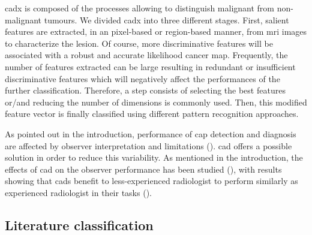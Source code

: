 \Ac{cadx} is composed of the processes allowing to distinguish malignant from non-malignant tumours. We divided \ac{cadx} into three different stages. First, salient features are extracted, in an pixel-based or region-based manner, from \ac{mri} images to characterize the lesion. Of course, more discriminative features will be associated with a robust and accurate likelihood cancer map. Frequently, the number of features extracted can be large resulting in redundant or insufficient discriminative features which will negatively affect the performances of the further classification. Therefore, a step consists of selecting the best features or/and reducing the number of dimensions is commonly used. Then, this modified feature vector is finally classified using different pattern recognition approaches.

As pointed out in the introduction, performance of \ac{cap} detection and diagnosis are affected by observer interpretation and limitations (\cite{Giger2008,Hambrock2013}). \ac{cad} offers a possible solution in order to reduce this variability. As mentioned in the introduction, the effects of \ac{cad} on the observer performance has been studied (\cite{Hambrock2013}), with results showing that \acp{cad} benefit to less-experienced radiologist to perform similarly as experienced radiologist in their tasks (\cite{Hambrock2013}). 


\subsection{Literature classification}


